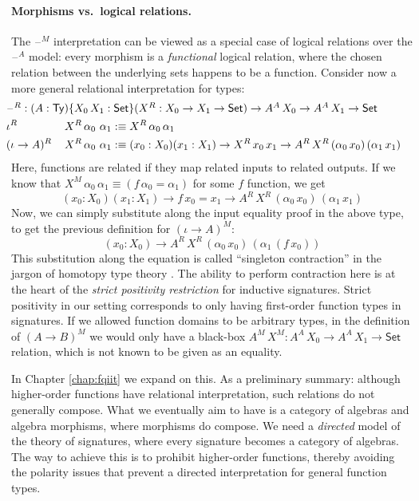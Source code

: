 \documentclass[12pt,a4paper,twoside,openany]{book}
\theoremstyle{remark}
\theoremstyle{definition}
\theoremstyle{theorem}
\newcommand{\Ty}{\mathsf{Ty}}
\newcommand{\blank}{\mathord{\hspace{1pt}\text{--}\hspace{1pt}}}
\newcommand{\Set}{\mathsf{Set}}
\newcommand{\defn}{:\equiv}
\begin{document}
\paragraph{Morphisms vs.\ logical relations.}
The $\blank^M$ interpretation can be viewed as a special case of logical
relations over the $\blank^A$ model: every morphism is a \emph{functional}
logical relation, where the chosen relation between the underlying sets happens
to be a function. Consider now a more general relational interpretation for
types:
\begin{alignat*}{3}
  & \hspace{-0.5em}\rlap{$\blank^R : (A : \Ty)\{X_0\,X_1 : \Set\}(X^R : X_0 \to X_1 \to \Set) \to A^A\,X_0 \to A^A\,X_1 \to \Set$}\\
  & \hspace{-0.5em}\iota^R\,&&X^R\,\alpha_0\,\,\alpha_1 \defn X^R\,\alpha_0\,\alpha_1 \\
  & \hspace{-0.5em}(\iota\to A)^R\,&&X^R\,\alpha_0\,\,\alpha_1 \defn
       (x_0 : X_0)(x_1 : X_1) \to X^R\,x_0\,x_1 \to A^R\,X^R\,(\alpha_0\,x_0)\,(\alpha_1\,x_1)
\end{alignat*}
Here, functions are related if they map related inputs to related outputs. If we
know that $X^M\,\alpha_0\,\alpha_1 \equiv (f\,\alpha_0 = \alpha_1)$ for some $f$
function, we get
\[
  (x_0 : X_0)(x_1 : X_1) \to f\,x_0 = x_1 \to A^R\,X^R\,(\alpha_0\,x_0)\,(\alpha_1\,x_1)
\]
Now, we can simply substitute along the input equality proof in the above type,
to get the previous definition for $(\iota \to A)^M$:
\[
  (x_0 : X_0) \to A^R\,X^R\,(\alpha_0\,x_0)\,(\alpha_1\,(f\,x_0))
\]
This substitution along the equation is called ``singleton contraction'' in the
jargon of homotopy type theory \cite{hottbook}. The ability to perform contraction
here is at the heart of the \emph{strict positivity restriction} for inductive
signatures. Strict positivity in our setting corresponds to only having
first-order function types in signatures. If we allowed function domains to be
arbitrary types, in the definition of $(A \to B)^M$ we would only have a
black-box $A^M\,X^M : A^A\,X_0 \to A^A\,X_1 \to \Set$ relation, which is not
known to be given as an equality.

In Chapter \ref{chap:fqiit} we expand on this. As a preliminary summary:
although higher-order functions have relational interpretation, such relations
do not generally compose. What we eventually aim to have is a category of
algebras and algebra morphisms, where morphisms do compose. We need a
\emph{directed} model of the theory of signatures, where every signature becomes
a category of algebras. The way to achieve this is to prohibit higher-order
functions, thereby avoiding the polarity issues that prevent a directed
interpretation for general function types.
\end{document}

